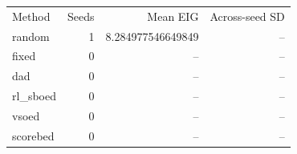 \begin{tabular}{lrrr}Method & Seeds & Mean EIG & Across-seed SD \\
random & 1 & 8.284977546649849 & -- \\
fixed & 0 & -- & -- \\
dad & 0 & -- & -- \\
rl_sboed & 0 & -- & -- \\
vsoed & 0 & -- & -- \\
scorebed & 0 & -- & -- \\
\end{tabular}